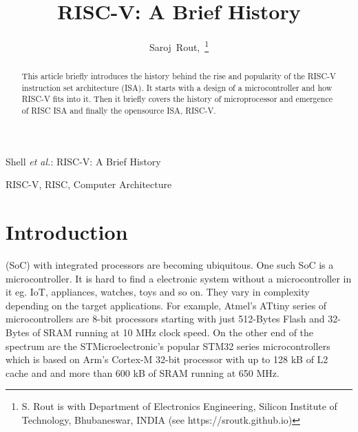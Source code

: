 \documentclass[journal]{IEEEtran}
\begin{document}
%
\title{RISC-V: A Brief History}
%
\author{Saroj~Rout,~\thanks{S. Rout is with Department of Electronics Engineering, Silicon Institute of Technology, Bhubaneswar, INDIA (see https://sroutk.github.io)} }%

%
{Shell \MakeLowercase{\textit{et al.}}: RISC-V: A Brief History}

\maketitle

\begin{abstract}
This article briefly introduces the history behind the rise and popularity of the RISC-V instruction set architecture (ISA). It starts with a design of a microcontroller and how RISC-V fits into it. Then it briefly covers the history of microprocessor and emergence of RISC ISA and finally the opensource ISA, RISC-V.
\end{abstract}

\begin{IEEEkeywords}
RISC-V, RISC, Computer Architecture
\end{IEEEkeywords}

\section{Introduction}

 (SoC) with integrated processors are becoming ubiquitous. One such SoC is a microcontroller. It is hard to find a electronic system without a microcontroller in it eg. IoT, appliances, watches, toys and so on. They vary in complexity depending on the target applications. For example, Atmel's ATtiny series of microcontrollers are 8-bit processors starting with just 512-Bytes Flash and 32-Bytes of SRAM running at 10 MHz clock speed. On the other end of the spectrum are the STMicroelectronic's popular STM32 series microcontrollers which is based on Arm's Cortex-M 32-bit processor with up to 128 kB of L2 cache and and more than 600 kB of SRAM running at 650 MHz.
\end{document}
